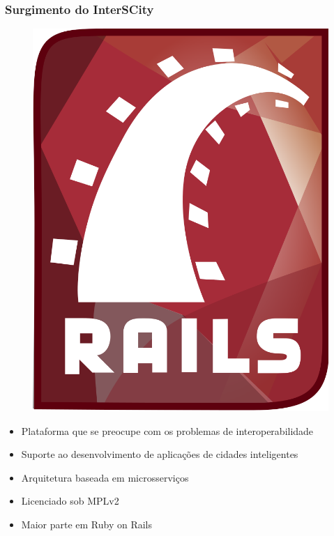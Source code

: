 \documentclass{beamer}
\begin{document}
    \begin{frame}
        \frametitle{Surgimento do InterSCity}
        \begin{figure}
            \includegraphics[scale=0.05]{figures/RoR.png}
        \end{figure}
        \begin{itemize}
            \item Plataforma que se preocupe com os problemas de interoperabilidade
            \item Suporte ao desenvolvimento de aplicações de cidades inteligentes
            \item Arquitetura baseada em microsserviços
            \item Licenciado sob MPLv2
            \item Maior parte em Ruby on Rails
        \end{itemize}
    \end{frame}
\end{document}
